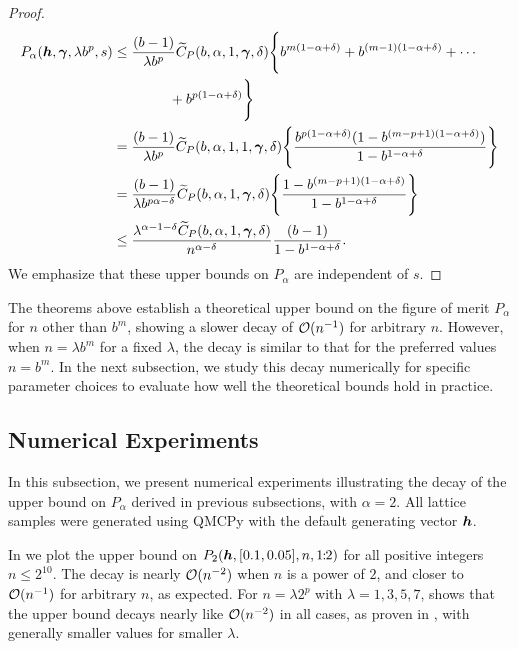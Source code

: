 \documentclass[authoryear]{elsarticle}
\begin{document}
\begin{proof}
\begin{align*}
        P_\alpha(\boldsymbol{h}, \boldsymbol{\gamma}, \lambda b^p, s) 
    &\leq \frac{(b - 1)}{\lambda b^p} \widetilde{C}_P(b,\alpha, 1, \boldsymbol{\gamma}, \delta)  \Bigg\{ 
        b^{m(1-\alpha + \delta)} + b^{(m-1)(1-\alpha + \delta)} + \cdots \\
        & \qquad \qquad 
     + b^{p(1-\alpha + \delta)} \Bigg\} \\
    &= \frac{(b - 1)}{\lambda b^p} \widetilde{C}_P(b,\alpha, 1, 1, \boldsymbol{\gamma}, \delta) \Bigg\{ \frac{b^{p( 1 - \alpha + \delta)}(1 - b^{(m-p+1)(1-\alpha +\delta)})}{1 - b^{1 - \alpha + \delta}} \Bigg\} \\
    &= \frac{(b - 1)}{\lambda b^{p\alpha - \delta}} \widetilde{C}_P(b,\alpha, 1, \boldsymbol{\gamma}, \delta) \Bigg\{ \frac{1 - b^{(m-p+1)(1-\alpha+\delta)}}{1 - b^{1 - \alpha + \delta}} \Bigg\} \\
    &\leq \frac{\lambda^{\alpha - 1 - \delta }\widetilde{C}_P(b,\alpha, 1, \boldsymbol{\gamma}, \delta)}{n^{\alpha - \delta}} \frac{(b-1)}{1 - b^{1 - \alpha + \delta}}. 
\end{align*}
We emphasize that these upper bounds on $P_\alpha$ are independent of $s$.
\end{proof}


The theorems above establish a theoretical upper bound on the figure of merit $P_\alpha$ for $n$ other than $b^m$, showing a slower decay of $\operatorname{{\mathcal O}}(n^{-1})$ for arbitrary $n$. However, when $n = \lambda b^m$ for a fixed $\lambda$, the decay is similar to that for the preferred values $n = b^m$. In the next subsection, we study this decay numerically for specific parameter choices to evaluate how well the theoretical bounds hold in practice.

\subsection{Numerical Experiments}

In this subsection, we present numerical experiments illustrating the decay of the upper bound on $P_\alpha$ derived in previous subsections, with $\alpha = 2$. All lattice samples 
were generated using QMCPy \citep{QMCPy2026a} with the default generating vector $\boldsymbol{h}$.

In  we plot the upper bound on $P_2(\boldsymbol{h},[0.1,0.05],n,1\!\!:\!\!2)$ for all positive integers $n \leq 2^{10}$. The decay is nearly $\operatorname{{\mathcal O}}(n^{-2})$ when $n$ is a power of $2$, and closer to $\operatorname{{\mathcal O}}(n^{-1})$ for arbitrary $n$, as expected. For $n =\lambda 2^p$ with $\lambda = 1, 3, 5, 7$,  shows that the upper bound %
decays nearly like $\operatorname{{\mathcal O}}(n^{-2})$ in all cases, as proven in , with generally smaller values for smaller $\lambda$.
\end{document}
